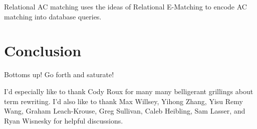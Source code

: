 \documentclass[sigconf]{acmart}
\begin{document}
Relational AC matching \cite{relationalac} uses the ideas of Relational E-Matching \cite{zhang2022relationalematching} to encode AC matching into database queries.%

\section{Conclusion}

Bottoms up! Go forth and saturate!



\begin{acks}
I'd especially like to thank Cody Roux for many many belligerant grillings about term rewriting. I'd also like to thank Max Willsey, Yihong Zhang, Yisu Remy Wang, Graham Leach-Krouse, Greg Sullivan, Caleb Heibling, Sam Lasser, and Ryan Wisnesky for helpful discussions.
\end{acks}



\end{document}
